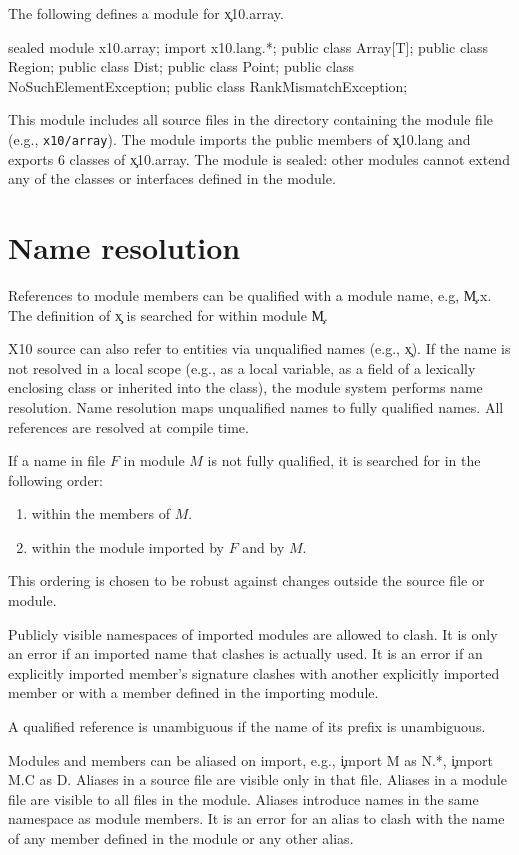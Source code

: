 \documentclass{article}
\newcommand\Xten{{\sf X10}\xspace}
\begin{document}
The following defines a module for \c{x10.array}.

\begin{xten}
sealed module x10.array;
import x10.lang.*;
public class Array[T];
public class Region;
public class Dist;
public class Point;
public class NoSuchElementException;
public class RankMismatchException;
\end{xten}

This module includes all source files in the directory containing
the module file (e.g., \texttt{x10/array}).
The module imports the public members of \c{x10.lang} and
exports 6 classes of \c{x10.array}.
The module is sealed: other modules cannot extend any of the
classes or interfaces defined in the module.

\section{Name resolution}

References to module members can be qualified with a module name,
e.g, \c{M.x}.  The definition of \c{x} is searched for within
module \c{M}.

\Xten source can also refer to entities via unqualified names (e.g.,
\c{x}).  If the name is not resolved in a 
local scope (e.g., as a local variable, as a field of
a lexically enclosing class or inherited into the class),
the module system performs name resolution.
Name resolution maps unqualified names
to fully qualified names.  All
references are resolved at compile time.

If a name in file $F$ in module $M$ is not fully qualified, 
it is searched for in the following order:
\begin{enumerate}
\item within the members of $M$.
\item within the module imported by $F$ and by $M$.
\end{enumerate}
This ordering is chosen to be robust against changes outside the
source file or module.

Publicly visible namespaces of imported modules are allowed to
clash.  It is only an error if an imported name that clashes is actually used.
It is an error if an explicitly imported member's signature clashes
with another explicitly imported member
or with a member defined in the importing module.

A qualified reference is unambiguous if the name
of its prefix is unambiguous.

Modules and members can be aliased on import, 
e.g., \c{import M as N.*}, \c{import M.C as D}.
Aliases in a source file are visible only in that file.
Aliases in a module file are visible to all files in the module.
Aliases introduce names in the same namespace as module
members.  It is an error for an alias to clash with the name
of any member defined in the module or any other alias.
\end{document}
